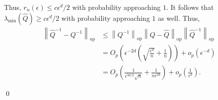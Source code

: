 \documentclass[11pt]{article}
\begin{document}
Thus, $r_n(\epsilon) \leq c\epsilon^d/2$ with probability approaching $1$. It follows that $\lambda_{\min}(\hat{Q}) \geq c\epsilon^d/2$ with probability approaching $1$ as well. Thus,
\begin{align*}
    \left\|\hat{Q}^{-1} - Q^{-1}\right\|_{\text{op}} &\leq \left\|Q^{-1}\right\|_{\text{op}}\left\|Q - \hat{Q}\right\|_{\text{op}}\left\|\hat{Q}^{-1}\right\|_{\text{op}} \\
    &= O_p\left(\epsilon^{-2d}\left(\sqrt{\frac{\epsilon^d}{n}} + \frac{1}{n}\right)\right) + o_p(\epsilon^{-d}) \\
    &= O_p\left(\frac{1}{\epsilon^{3d/2}\sqrt{n}} + \frac{1}{n\epsilon^{2d}}\right) + o_p\left(\frac{1}{\epsilon^d}\right).
\end{align*}

\qed{}
\end{document}

